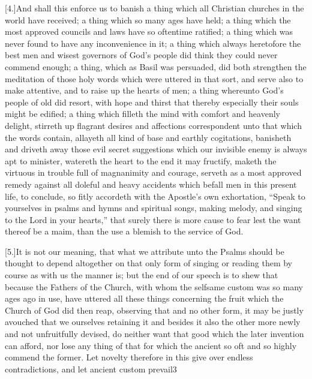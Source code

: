[4.]And shall this enforce us to banish a thing which all Christian churches in the world have received; a thing which so many ages have held; a thing which the most approved councils and laws have so oftentime ratified; a thing which was never found to have any inconvenience in it; a thing which always heretofore the best men and wisest governors of God’s people did think they could never commend  enough;
 a thing, which as Basil was persuaded, did both strengthen the meditation of those holy words which were uttered in that sort, and serve also to make attentive, and to raise up the hearts of men; a thing whereunto God’s people of old did resort, with hope and thirst that thereby especially their souls might be edified; a thing which filleth the mind with comfort and heavenly delight, stirreth up flagrant desires and affections correspondent unto that which the words contain, allayeth all kind of base and earthly cogitations, banisheth and driveth away those evil secret suggestions which our invisible enemy is always apt to minister, watereth the heart to the end it may fructify, maketh the virtuous in trouble full of magnanimity and courage, serveth as a most approved remedy against all doleful and heavy accidents which befall men in this present life, to conclude, so fitly accordeth with the Apostle’s own exhortation, “Speak to yourselves in psalms and hymns and spiritual songs, making melody, and singing to the Lord in your hearts,” that surely there is more cause to fear lest the want thereof be a maim, than the use a blemish to the service of God.

[5.]It is not our meaning, that what we attribute unto the Psalms should be thought to depend altogether on that only form of singing or reading them by course as with us the manner is; but the end of our speech is to shew that because the Fathers of the Church, with whom the selfsame custom was so many ages ago in use, have uttered all these things concerning the fruit which the Church of God did then reap, observing that and no other form, it may be justly avouched that we ourselves retaining it and besides it also the other more newly and not unfruitfully devised, do neither want that good which the later invention can afford, nor lose any thing of that for which the ancient so oft and so highly commend the former. Let novelty therefore in this give over endless contradictions, and let ancient custom prevail3


